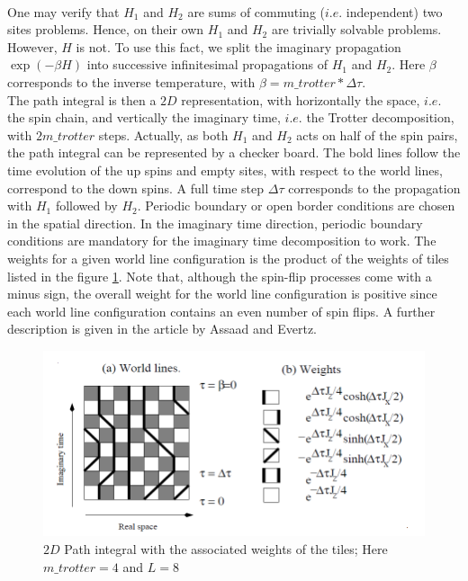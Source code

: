 \documentclass[a4paper,12pt]{article}
\begin{document}
	\paragraph{} One may verify that $H_1$ and $H_2$ are sums of commuting ($i.e.$ independent) two sites problems. Hence, on their own $H_1$ and $H_2$ are trivially solvable problems. However, $H$ is not. To use this fact, we split the imaginary propagation $\exp(-\beta H)$ into successive infinitesimal propagations of $H_1$ and $H_2$. Here $\beta$ corresponds
	to the inverse temperature, with $\beta = m\_trotter * \Delta \tau$.\\
	The path integral is then a $2D$ representation, with horizontally the space, $i.e.$ the spin chain, and vertically the imaginary time, $i.e.$ the Trotter decomposition, with $2 m\_trotter$ steps. Actually, as both $H_1$ and $H_2$ acts on half of the spin pairs, the path integral can be represented by a checker board. The bold lines follow the time evolution of the up	spins and empty sites, with respect to the world lines, correspond to the down spins. A full time step $\Delta \tau$ corresponds to the propagation with $H_1$ followed by	$H_2$. Periodic boundary or open border  conditions are chosen in the spatial direction. In the imaginary time direction, periodic boundary conditions are mandatory for the imaginary time decomposition to work. The weights for a given world line configuration is the product of the
	weights of tiles listed in the figure \ref{pathintegral}. Note that, although the spin-flip processes come with a minus sign, the overall weight for the world line configuration is positive since each world line configuration contains an even number of spin flips. A further description is given in the article by Assaad and Evertz. 
	
	\begin{figure}[H]
		\centering
		\includegraphics[width=12cm]{pathintegral.png}
		\caption{$2D$ Path integral with the associated weights of the tiles; Here $m\_trotter = 4$ and $L=8$}
		\label{pathintegral}
	\end{figure}
\end{document}
